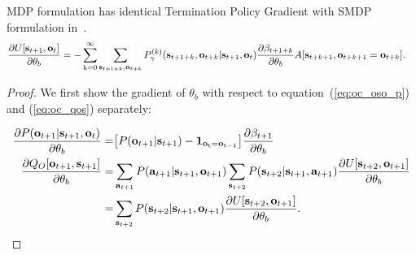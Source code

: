 \begin{prop}
  \label{approp:oc_b_grad}
  MDP formulation has identical Termination Policy Gradient with
  SMDP formulation in~\cite{bacon2017option}.
  \begin{align}
    \label{eq:oc_b_grad}   \frac{\partial U[ {\mathbf{s}}_{t+1},{\mathbf{o}}_t ]}{\partial \theta_b}=
    -\sum_{{\textnormal{k}}=0}^\infty&\sum_{{\mathbf{s}}_{t+1+k},{\mathbf{o}}_{t+k}}P_\gamma^{(k)}({\mathbf{s}}_{t+1+k},{\mathbf{o}}_{t+k}|{\mathbf{s}}_{t+1},{\mathbf{o}}_t)
                         \frac{\partial \beta_{t+1+k}}{\partial \theta_b}A[ {\mathbf{s}}_{t+k+1},{\mathbf{o}}_{t+k+1}={\mathbf{o}}_{t+k}].
  \end{align}
\end{prop}

\begin{proof}
  We first show the gradient of $\theta_b$ with respect to
  equation~(\ref{eq:oc_oso_p}) and (\ref{eq:oc_qos}) separately:

  \begin{align}
    \label{eq:oc_oso_p_grad} \frac{\partial P({\mathbf{o}}_{t+1}|{\mathbf{s}}_{t+1},{\mathbf{o}}_{t})}{\partial \theta_b} = &\big[P({\mathbf{o}}_{t+1}|{\mathbf{s}}_{t+1})-\bm{1}_\mathrm{{\mathbf{o}}_t={\mathbf{o}}_{t-1}}\big]\frac{\partial \beta_{t+1}}{\partial \theta_b}\\
    \nonumber\frac{\partial Q_O[{\mathbf{o}}_{t+1},{\mathbf{s}}_{t+1}]}{\partial \theta_b} =& \sum_{{\mathbf{a}}_{t+1}}P({\mathbf{a}}_{t+1}|{\mathbf{s}}_{t+1},{\mathbf{o}}_{t+1})\sum_{{\mathbf{s}}_{t+2}}P({\mathbf{s}}_{t+2}|{\mathbf{s}}_{t+1},{\mathbf{a}}_{t+1})\frac{\partial U[{\mathbf{s}}_{t+2},{\mathbf{o}}_{t+1}]}{\partial \theta_b}\\
 \label{eq:oc_qos_grad}   =&\sum_{{\mathbf{s}}_{t+2}}P({\mathbf{s}}_{t+2}|{\mathbf{s}}_{t+1},{\mathbf{o}}_{t+1})\frac{\partial U[{\mathbf{s}}_{t+2},{\mathbf{o}}_{t+1}]}{\partial \theta_b}.
  \end{align}


\end{proof}
